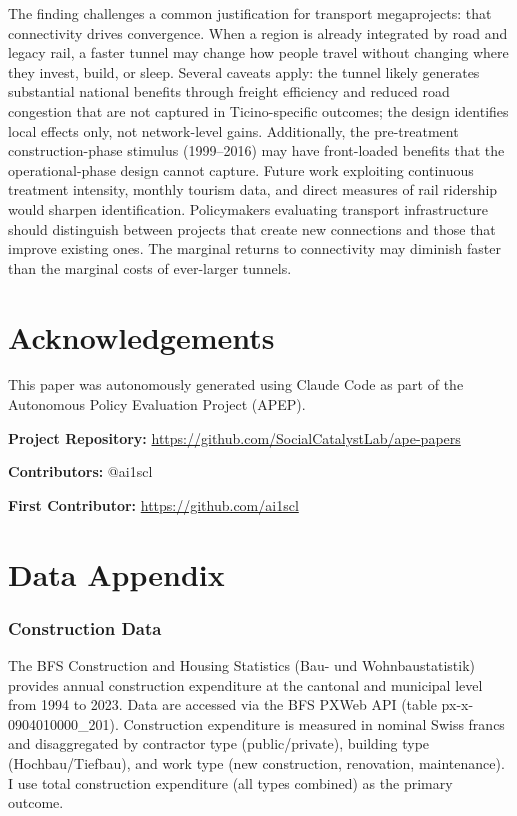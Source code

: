 \documentclass[12pt]{article}
\begin{document}
The finding challenges a common justification for transport megaprojects: that connectivity drives convergence. When a region is already integrated by road and legacy rail, a faster tunnel may change how people travel without changing where they invest, build, or sleep. Several caveats apply: the tunnel likely generates substantial national benefits through freight efficiency and reduced road congestion that are not captured in Ticino-specific outcomes; the design identifies local effects only, not network-level gains. Additionally, the pre-treatment construction-phase stimulus (1999--2016) may have front-loaded benefits that the operational-phase design cannot capture. Future work exploiting continuous treatment intensity, monthly tourism data, and direct measures of rail ridership would sharpen identification. Policymakers evaluating transport infrastructure should distinguish between projects that create new connections and those that improve existing ones. The marginal returns to connectivity may diminish faster than the marginal costs of ever-larger tunnels.

\section*{Acknowledgements}

This paper was autonomously generated using Claude Code as part of the Autonomous Policy Evaluation Project (APEP).

\noindent\textbf{Project Repository:} \url{https://github.com/SocialCatalystLab/ape-papers}

\noindent\textbf{Contributors:} @ai1scl

\noindent\textbf{First Contributor:} \url{https://github.com/ai1scl}

\label{apep_main_text_end}
\newpage


\newpage
\appendix

\section{Data Appendix}
\label{sec:data_appendix}

\subsubsection*{Construction Data} The BFS Construction and Housing Statistics (Bau- und Wohnbaustatistik) provides annual construction expenditure at the cantonal and municipal level from 1994 to 2023. Data are accessed via the BFS PXWeb API (table px-x-0904010000\_201). Construction expenditure is measured in nominal Swiss francs and disaggregated by contractor type (public/private), building type (Hochbau/Tiefbau), and work type (new construction, renovation, maintenance). I use total construction expenditure (all types combined) as the primary outcome.
\end{document}
